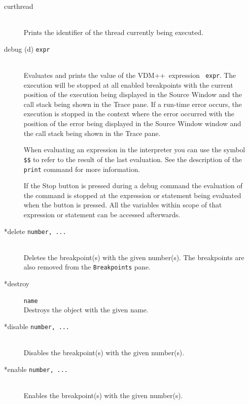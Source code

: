 \documentclass[\pformat,12pt]{article}
\newcommand{\vdmslpp}{VDM++}
\newcommand{\guicmd}[1]{{\sf #1}}
\begin{document}
\begin{description}
\item[curthread]\mbox{}\\
  Prints the identifier of the thread currently being executed.

\item[debug (d) {\tt expr}]  \mbox{}\\
  Evaluates and prints the value of the \vdmslpp\ expression {\tt
    expr}.  The execution will be stopped at all enabled breakpoints
   with the current position of the execution being
  displayed in the  \guicmd{Source Window} and the call stack being
  shown in the 
  \guicmd{Trace} pane. If a run-time error occurs, the
  execution is stopped in the context where the error occurred
  with the position of the error being displayed in the \guicmd{Source Window}
  window and the call stack being shown in the \guicmd{Trace}
  pane.
  
  When evaluating an expression in the interpreter you can use the 
  symbol {\tt \$\$}\index{\$\$} to refer to the result of the last
  evaluation. See the description of the {\tt print} command for more
  information.
  
  If the \guicmd{Stop} button is pressed during a
  debug 
  command the evaluation of the command is stopped at the expression
  or statement being evaluated when the button is pressed. All the
  variables within scope of that expression or statement can be
  accessed afterwards.
  
\item[*delete {\tt number, ...}] 
\mbox{}\\
  Deletes the breakpoint(s) with the given number(s). The breakpoints
  are also removed from the \texttt{Breakpoints} pane.
  
\item[*destroy] {\tt name}\mbox{}\\
  Destroys the object with the given name.

\item[*disable \texttt{number, ...}]
\mbox{}\\
  Disables the breakpoint(s) with the given number(s).
  
\item[*enable \texttt{number, ...}]
\mbox{}\\
  Enables the breakpoint(s) with the given number(s).
  

\end{description}
\end{document}
